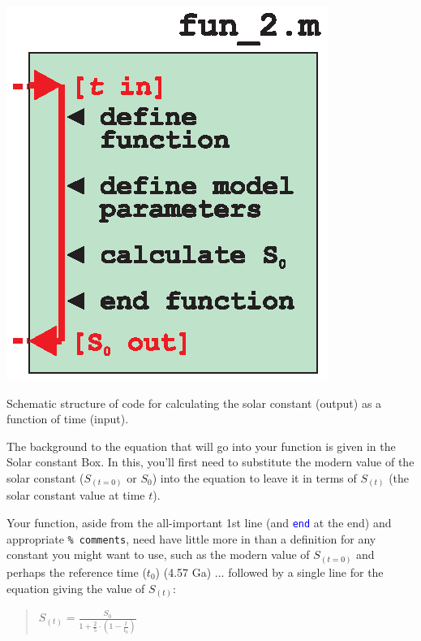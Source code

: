 \documentclass{tufte-book} %
\newenvironment{docspeclarge}{\begin{quotation}\ttfamily\large\parskip0pt\parindent0pt\ignorespaces}{\end{quotation}}
\begin{document}
\begin{marginfigure}[0.0in]
\includegraphics[width=\linewidth]{ch8-schematic-fun2.eps}
\caption{Schematic structure of code for calculating the solar constant (output) as a function of time (input).}
\label{fig:ch8-schematic-fun2}
\end{marginfigure}

The background to the equation that will go into your function is given in the Solar constant Box. In this, you'll first need to substitute the modern value of the solar constant (\(S_{(t=0)}\) or \(S_{0}\)) into the equation to leave it in terms of \(S_{(t)}\) (the solar constant value at time \(t\)).
 
Your function, aside from the all-important 1st line (and \textcolor{blue}{\texttt{end}} at the end) and appropriate \textcolor[rgb]{0,0.501961,0.25098}{\texttt{\% comments}}, need have little more in than a definition for any constant you might want to use, such as the modern value of \(S_{(t=0)}\) and perhaps the reference time (\(t_{0}\)) (4.57 Ga) ... followed by a single line for the equation giving the value of \(S_{(t)}\):
\begin{docspeclarge}
\(S_{(t)} = \frac{S_{0}}{1+\frac{2}{5}\cdot (1-\frac{t}{t_{0}})}\)
\end{docspeclarge} 
\end{document}
